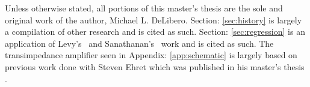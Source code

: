 Unless otherwise stated, all portions of this master's thesis are the sole and original work of the author, Michael L. DeLibero.
Section: \ref{sec:history}  is largely a compilation of other research and is cited as such. 
Section: \ref{sec:regression}  is an application of Levy's~\cite{levy} and Sanathanan's~\cite{levy_iter} work and is cited as such. 
The transimpedance amplifier seen in Appendix: \ref{app:schematic}  is largely based on previous work done with Steven Ehret which was published in his master's thesis \cite{steve_thesis}.

